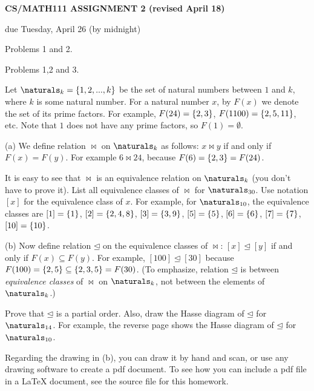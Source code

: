 \documentclass{article}
\begin{document}
\centerline{\large \bf CS/MATH111 ASSIGNMENT 2 (revised April 18)}
\centerline{due Tuesday, April 26 (by midnight)}

\vskip 0.2in
 Problems 1 and 2.

 Problems 1,2 and 3.

\vskip 0.2in


\begin{problem}
Let $\naturals_k = \braced{1,2,...,k}$ be the set of natural numbers between
$1$ and $k$, where $k$ is some natural number.
For a natural number $x$, by $F(x)$ we denote the set of its prime
factors.
For example, $F(24) = {\left\{ 2,3 \right\} }$, $F(1100) = {\left\{ 2,5,11 \right\} }$, etc.
Note that $1$ does not have any prime factors, so $F(1) = \emptyset$.

\medskip
\noindent
(a) We define relation $\bowtie$ on $\naturals_k$ as follows:
$x \bowtie y$ if and only if $F(x) = F(y)$.
For example $6 \bowtie 24$, because $F(6) = {\left\{ 2,3 \right\} } = F(24)$.

It is easy to see that $\bowtie$ is an equivalence relation on
$\naturals_k$ (you don't have  to prove it).
List all equivalence classes of $\bowtie$ for $\naturals_{30}$.
Use notation $[x]$ for the equivalence class of $x$.
For example, for $\naturals_{10}$, the equivalence classes
are $[1]= {\left\{ 1 \right\} }$,
$[2] = {\left\{ 2,4,8 \right\} }$,
$[3] = {\left\{ 3,9 \right\} }$,
$[5] = {\left\{ 5 \right\} }$,
$[6] = {\left\{ 6 \right\} }$,
$[7] = {\left\{ 7 \right\} }$,
$[10] = {\left\{ 10 \right\} }$.

\medskip
\noindent
(b)
Now define relation $\unlhd$ on the equivalence classes of
$\bowtie$:
$[x]\unlhd [y]$ if and only if $F(x) \subseteq F(y)$.
For example, $[100]\unlhd [30]$
because $F(100) = {\left\{ 2,5 \right\} }\subseteq  {\left\{ 2,3,5 \right\} } = F(30)$.
(To emphasize, relation $\unlhd$ is between \emph{equivalence classes}
of $\bowtie$ on $\naturals_k$, not between the elements of $\naturals_k$.)

Prove that $\unlhd$ is a partial order.
Also, draw the Hasse diagram of $\unlhd$ for $\naturals_{14}$. For example,
the reverse page shows the Hasse diagram of $\unlhd$ for $\naturals_{10}$.

\medskip
Regarding the drawing in (b), you can draw it by hand and scan, or use any
drawing software to create a pdf document. To see how you can include a pdf file
in a {\LaTeX} document, see the source file for this homework.
\end{problem}
\end{document}
